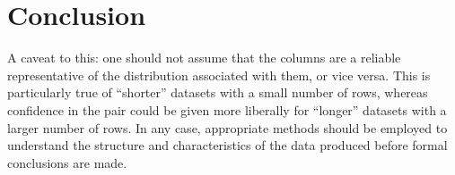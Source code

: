 \section{Conclusion}

{\color{red}{Rough notes still}}

A caveat to this: one should not assume that the columns are a reliable
representative of the distribution associated with them, or vice versa. This is
particularly true of ``shorter'' datasets with a small number of rows, whereas
confidence in the pair could be given more liberally for ``longer'' datasets
with a larger number of rows. In any case, appropriate methods should be
employed to understand the structure and characteristics of the data produced
before formal conclusions are made.
